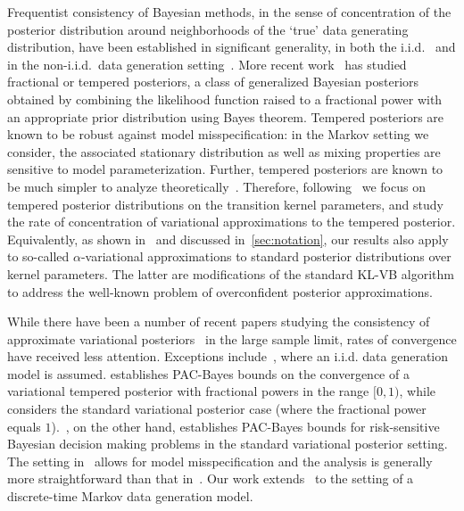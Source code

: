 \documentclass[11pt]{amsart}
\begin{document}
Frequentist consistency of Bayesian methods, in the sense of concentration of the posterior distribution around neighborhoods of the `true' data generating distribution, have been established in significant generality, in both the i.i.d.\ \cite{ghosh,shen,rous} and in the non-i.i.d.\ data generation setting~\cite{ghoshal,pati}.
More recent work~\cite{pierre,bhatta,pati} has studied {fractional or tempered posteriors}, a class of generalized Bayesian posteriors obtained by combining the likelihood function raised to a fractional power with an appropriate prior distribution using Bayes theorem.
Tempered posteriors are known to be robust against model misspecification: in the Markov setting we consider, the associated stationary distribution  as well as mixing properties are sensitive to model parameterization. 
Further, tempered posteriors are known to be much simpler to analyze theoretically~\cite{bhatta,pati}.
Therefore, following~\cite{pierre,bhatta,pati} we focus on tempered posterior distributions on the transition kernel parameters, and study the rate of concentration of variational approximations to the tempered posterior. 
Equivalently, as shown in~\cite{bhatta} and discussed in~\cref{sec:notation}, our results also apply to so-called $\alpha$-variational approximations to standard posterior distributions over kernel parameters.
The latter are modifications of the standard KL-VB algorithm to address the well-known problem of overconfident posterior approximations.

While there have been a number of recent papers studying the consistency of approximate variational posteriors~\cite{blei1,prateek2,pierre} in the large sample limit, rates of convergence have received less attention. Exceptions include~\cite{pierre,zhang,prateek1}, where an i.i.d. data generation model is assumed. \cite{pierre} establishes PAC-Bayes bounds on the convergence of a variational {tempered posterior} with fractional powers in the range $[0,1)$, while~\cite{zhang} considers the standard variational posterior case (where the fractional power equals $1$).~\cite{prateek1}, on the other hand, establishes PAC-Bayes bounds for risk-sensitive Bayesian decision making problems in the standard variational posterior setting. The setting in~\cite{pierre} allows for model misspecification and the analysis is generally more straightforward than that in~\cite{zhang,prateek1}. Our work extends~\cite{pierre} to the setting of a discrete-time Markov data generation model. 
\end{document}
